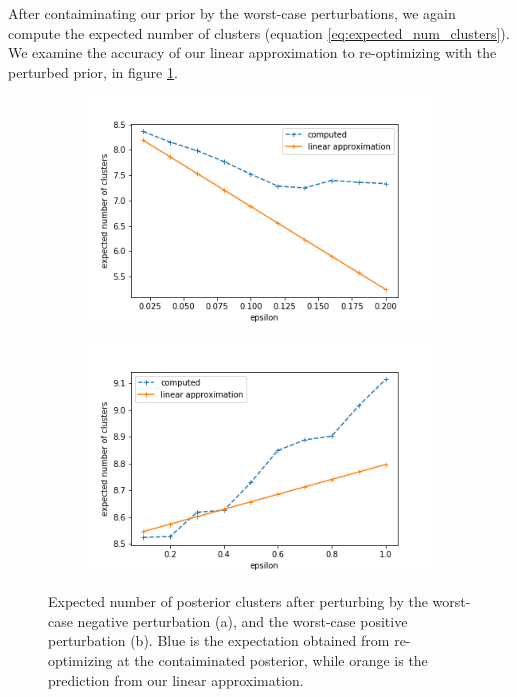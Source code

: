 \documentclass[a4paper]{article}
\begin{document}
After contaiminating our prior by the worst-case perturbations, we again compute the
expected number of clusters (equation \ref{eq:expected_num_clusters}). We examine the
accuracy of our linear approximation to re-optimizing with the perturbed prior,
in figure \ref{fig:worst_case_results}.

\begin{figure}[h!]
	\centering
	\begin{subfigure}[t]{0.4\textwidth}
		\includegraphics[width = \textwidth]{./func_sens_results/worst_case_neg_influence_results.png}
		\subcaption{}
	\end{subfigure}
  \begin{subfigure}[t]{0.4\textwidth}
    \includegraphics[width = \textwidth]{./func_sens_results/worst_case_pos_influence_results.png}
    \subcaption{}
  \end{subfigure}
  \caption{Expected number of posterior clusters after perturbing by the worst-case
  negative perturbation (a), and the worst-case positive perturbation (b). Blue is the
  expectation obtained from re-optimizing at the contaiminated posterior, while
  orange is the prediction from our linear approximation. }
  \label{fig:worst_case_results}
\end{figure}
\end{document}
